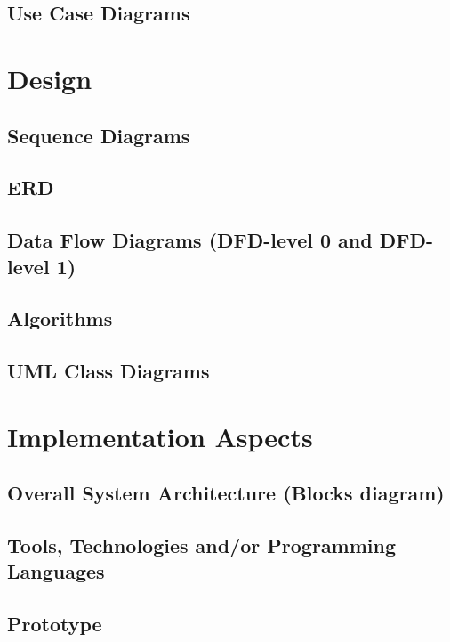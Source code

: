 \documentclass{article}
\begin{document}
		\subsection{Use Case Diagrams}
	
	\section{Design}
		\subsection{Sequence Diagrams}
		
		\subsection{ERD}
		
		\subsection{Data Flow Diagrams (DFD-level 0 and DFD-level 1)}
		
		\subsection{Algorithms}
		
		\subsection{UML Class Diagrams}
	
	\section{Implementation Aspects}
		\subsection{Overall System Architecture (Blocks diagram)}
		
		\subsection{Tools, Technologies and/or Programming Languages}
		
		\subsection{Prototype}
	
\end{document}
